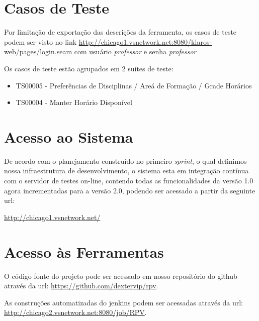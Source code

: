 \documentclass{abnt}
\begin{document}
	\clearpage
	
		\section{Casos de Teste}
		
		 Por limitação de exportação das descrições da ferramenta, os casos de teste podem ser visto no link \url{http://chicago1.vsnetwork.net:8080/klaros-web/pages/login.seam} com usuário \emph{professor} e senha \emph{professor}
		 
		 Os casos de teste estão agrupados em 2 suites de teste:
		 \begin{itemize}
		 \item TS00005 - Preferências de Disciplinas / Areá de Formação / Grade Horários
		 \item TS00004 - Manter Horário Disponível
		 \end{itemize}
		 		 
\clearpage
	\section{Acesso ao Sistema}
			De acordo com o planejamento construído no primeiro \emph{sprint}, o qual definimos nossa infraestrutura de desenvolvimento, 
			o sistema esta em integração contínua com o servidor de testes on-line, contendo todas as funcionalidades da versão 1.0 agora incrementadas para a versão 2.0, 
			podendo ser acessado a partir da seguinte url:
		
			\url{http://chicago1.vsnetwork.net/}
			
			
			

	\section{Acesso às Ferramentas}
		
		O código fonte do projeto pode ser acessado em nosso repositório do github\cite{GITHUB} através da url: \url{https://github.com/dextervip/rpv}. 
		
		As construções automatizadas do jenkins podem ser acessadas através da url: \url{http://chicago2.vsnetwork.net:8080/job/RPV}.

	\clearpage

	\nocite{*}
	
			
\end{document}
